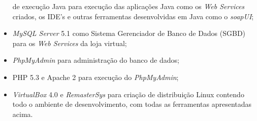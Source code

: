 \begin{itemize}
	de execução Java para execução das aplicações Java como os \textit{Web Services} criados, os IDE's e outras
	ferramentas desenvolvidas em Java como o \textit{soapUI};
	\item \textit{MySQL Server} 5.1 como Sistema Gerenciador de Banco de Dados (SGBD) para os \textit{Web Services} da loja virtual;
	\item \textit{PhpMyAdmin} para administração do banco de dados;
	\item PHP 5.3 e Apache 2 para execução do \textit{PhpMyAdmin};
	\item \textit{VirtualBox} 4.0 e \textit{RemasterSys} para criação de distribuição Linux contendo todo o ambiente de desenvolvimento, com
	todas as ferramentas apresentadas acima.
\end{itemize}



